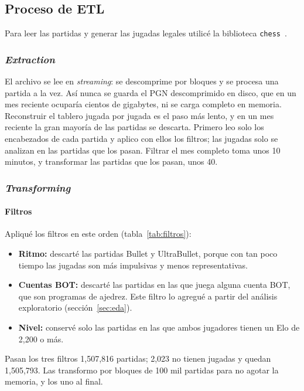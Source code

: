 \documentclass[a4paper,12pt,twocolumn]{article}
\begin{document}
\subsection{Proceso de ETL}

Para leer las partidas y generar las jugadas legales utilicé la biblioteca \texttt{chess}~\cite{pythonChess}.

\subsubsection{\textit{Extraction}}

El archivo se lee en \textit{streaming}: se descomprime por bloques y se procesa una partida a la vez. Así nunca se guarda el PGN descomprimido en disco, que en un mes reciente ocuparía cientos de gigabytes, ni se carga completo en memoria.
\newline
Reconstruir el tablero jugada por jugada es el paso más lento, y en un mes reciente la gran mayoría de las partidas se descarta. Primero leo solo los encabezados de cada partida y aplico con ellos los filtros; las jugadas solo se analizan en las partidas que los pasan. Filtrar el mes completo toma unos 10 minutos, y transformar las partidas que los pasan, unos 40.

\subsubsection{\textit{Transforming}}

\paragraph{Filtros}

Apliqué los filtros en este orden (tabla~\ref{tab:filtros}):
\begin{itemize}[leftmargin=*]
	\item \textbf{Ritmo:} descarté las partidas Bullet y UltraBullet, porque con tan poco tiempo las jugadas son más impulsivas y menos representativas.
	\item \textbf{Cuentas BOT:} descarté las partidas en las que juega alguna cuenta BOT, que son programas de ajedrez. Este filtro lo agregué a partir del análisis exploratorio (sección~\ref{sec:eda}).
	\item \textbf{Nivel:} conservé solo las partidas en las que ambos jugadores tienen un Elo de 2,200 o más.
\end{itemize}
Pasan los tres filtros 1,507,816 partidas; 2,023 no tienen jugadas y quedan 1,505,793. Las transformo por bloques de 100 mil partidas para no agotar la memoria, y los uno al final.
\end{document}
